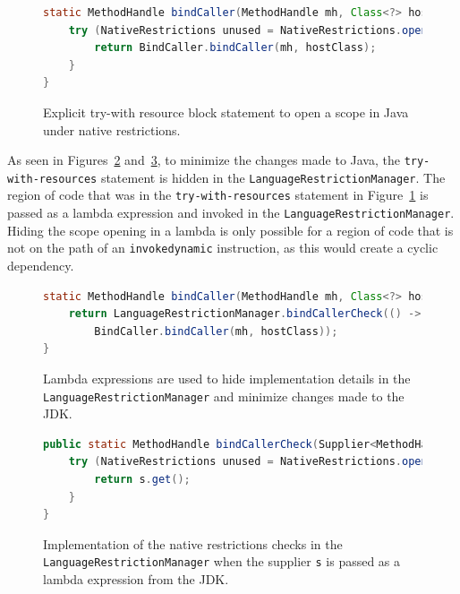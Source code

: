 \begin{figure}[ht]
    \centering
\begin{lstlisting}[language=Java]
static MethodHandle bindCaller(MethodHandle mh, Class<?> hostClass) {
    try (NativeRestrictions unused = NativeRestrictions.openScope()) {
        return BindCaller.bindCaller(mh, hostClass);
    }
}
\end{lstlisting}
    \caption{Explicit try-with resource block statement to open a scope in Java under native restrictions.}
    \label{fig:bind_caller_twr}
\end{figure}

As seen in Figures~\ref{fig:bind_caller_lambda} and~\ref{fig:bind_caller_lrm}, to minimize the changes made to Java, the \verb|try-with-resources| statement is hidden in the \verb|LanguageRestrictionManager|. The region of code that was in the \verb|try-with-resources| statement in Figure~\ref{fig:bind_caller_twr} is passed as a lambda expression and invoked in the \verb|LanguageRestrictionManager|. Hiding the scope opening in a lambda is only possible for a region of code that is not on the path of an \verb|invokedynamic| instruction, as this would create a cyclic dependency. 

\begin{figure}[ht]
    \centering
\begin{lstlisting}[language=Java]
static MethodHandle bindCaller(MethodHandle mh, Class<?> hostClass) {
    return LanguageRestrictionManager.bindCallerCheck(() -> 
        BindCaller.bindCaller(mh, hostClass));
}
\end{lstlisting}
    \caption{Lambda expressions are used to hide implementation details in the \texttt{LanguageRestrictionManager} and minimize changes made to the JDK.}
    \label{fig:bind_caller_lambda}
\end{figure}

\begin{figure}[ht]
    \centering
\begin{lstlisting}[language=Java]
public static MethodHandle bindCallerCheck(Supplier<MethodHandle> s) {
    try (NativeRestrictions unused = NativeRestrictions.openScope()) {
        return s.get();
    }
}
\end{lstlisting}
    \caption{Implementation of the native restrictions checks in the \texttt{LanguageRestrictionManager} when the supplier \texttt{s} is passed as a lambda expression from the JDK.}
    \label{fig:bind_caller_lrm}
\end{figure}

